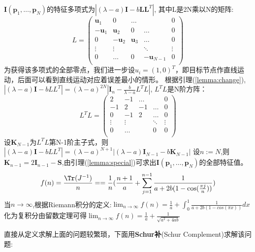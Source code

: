 $\bm{I}(\bm{p}_1,\dots,\bm{p}_N)$的特征多项式为$|(\lambda-a)\bm{I}-b\bm{L}\bm{L}^T|$,
其中L是2N乘以N的矩阵:
\[
L=\left(
\begin{array}{ccccc}
\bm{u}_1&0&\dots&&0\\
-\bm{u}_1&\bm{u}_2&0&\dots&0\\
0&-\bm{u}_2&\bm{u}_3&\dots&0\\
\vdots &\vdots&&\ddots &\vdots\\
0&\dots&0&-\bm{u}_{N-1}&0\\
\end{array}
\right)
\]
为获得该多项式的全部零点，我们进一步设$u_i=(1,0)^T$，即目标节点作直线运动，后面可以看到直线运动对应着误差最小的情形。
根据引理(\ref{lemma:change}),$|(\lambda-a)\bm{I}-bLL^T|=(\lambda-a)^{2N}|\bm{I}_n-\frac{b}{\lambda-a}L^TL|$,
$L^TL$是N阶方阵：
\[
L^TL=\left(
\begin{array}{ccccc}
2&-1&\dots&&0\\
-1&2&-1&\dots&0\\
0&-1&2&\dots&0\\
\vdots &\vdots&&\ddots &\vdots\\
0&\dots&&0&0\\
\end{array}
\right)
\]
设$\bm{K}_{N-1}$为$L^TL$第N-1阶主子式，则
$|(\lambda-a)\bm{I}-bLL^T|=(\lambda-a)^{N+1}|(\lambda-a)\bm{I}_{N-1}-b\bm{K}_{N-1}|$
设$n:=N$,则$\bm{K}_{n-1}=2\bm{I}_{n-1}-\bm{S}$,由引理(\ref{lemma:special})可求出$\bm{I}(\bm{p}_1,\dots,\bm{p}_N)$的全部特征值。
\[
f(n)=\frac{\Tr(J^{-1})}{n}==\frac{1}{n}(\frac{n+1}{a}+\sum_{j=1}^{n-1}\frac{1}{a+2b(1-\cos(\frac{\pi j}{n}))})
\]
当$n\to \infty$,根据Riemann积分的定义:$\lim_{n\rightarrow \infty}f(n)=\frac{1}{a}+\int_0^1 \frac{1}{a+2b(1-cos(\pi x))}dx$
化为复积分由留数定理可得$\lim_{n\rightarrow \infty}f(n)=\frac{1}{a}+\frac{1}{\sqrt{a^2+4ab}}$

直接从定义求解上面的问题较繁琐，下面用\textbf{Schur补}(Schur Complement)求解该问题:

